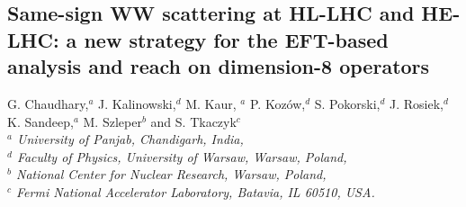 \documentclass[../report.tex]{subfiles}
\providecommand{\main}{..}
\begin{document}


\subsection{ Same-sign WW scattering at HL-LHC and HE-LHC: a new strategy for the EFT-based analysis and reach on dimension-8 operators}\label{sect-ssWW}
\begin{center}
 {G. Chaudhary,$^a$ 
 J. Kalinowski,$^{d} $
 M. Kaur, $^a$
P. Koz{\'o}w,$^d$ S. Pokorski,$^d$
J. Rosiek,$^d$ 
K. Sandeep,$^a$
M. Szleper$^b$ 
and
S. Tkaczyk$^c$\\
}
 {\small \it
$^a$ University of Panjab, Chandigarh, India,\\
 $^d$ Faculty of Physics, University of Warsaw, Warsaw,  Poland, \\
$^b$ National Center for Nuclear Research,  Warsaw, Poland, \\
$^c$  Fermi National Accelerator Laboratory, Batavia, IL 60510, USA.}
\end{center}




 

\end{document}
